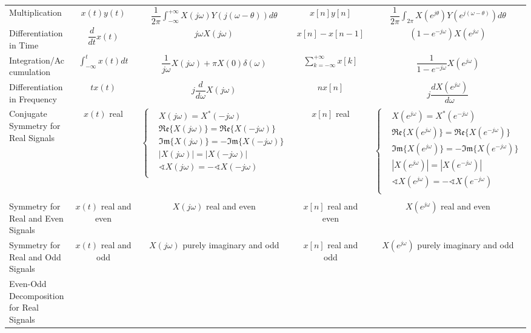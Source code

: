 \documentclass[landscape,a4paper]{article}
\begin{document}
\begin{table}[htbp]
\begin{tabular}{p{12em}<{\centering}cccc}
Multiplication & $x(t)y(t)$ & $\displaystyle\dfrac{1}{2\pi}\int_{-\infty}^{+\infty}X(j\omega)Y(j(\omega-\theta))d\theta$ 
& $x[n]y[n]$ & $\displaystyle\dfrac{1}{2\pi}\int_{2\pi} X(e^{j\theta})Y(e^{j(\omega-\theta)})d\theta$ \\
Differentiation in Time & $\dfrac{d}{dt}x(t)$ & $j\omega X(j\omega)$
& $x[n]-x[n-1]$ & $(1-e^{-j\omega})X(e^{j\omega})$ \\
Integration/Accumulation & $\displaystyle\int_{-\infty}^tx(t)dt$ & $\dfrac{1}{j\omega}X(j\omega)+\pi X(0)\delta(\omega)$ 
& $\displaystyle\sum\limits_{k=-\infty}^{+\infty}x[k]$ & $\dfrac{1}{1-e^{-j\omega}}X(e^{j\omega})$ \\
Differentiation in Frequency & $tx(t)$ & $j\dfrac{d}{d\omega}X(j\omega)$ 
& $nx[n]$ & $j\dfrac{dX(e^{j\omega})}{d\omega}$ \\
Conjugate Symmetry for Real Signals & $x(t)$ real & 
$\left\lbrace\begin{aligned}
&X(j\omega)=X^*(-j\omega) \\
&\mathfrak{Re}\{X(j\omega)\}=\mathfrak{Re}\{X(-j\omega)\} \\
&\mathfrak{Im}\{X(j\omega)\}=-\mathfrak{Im}\{X(-j\omega)\} \\
&|X(j\omega)|=|X(-j\omega)| \\
&\sphericalangle X(j\omega)=-\sphericalangle X(-j\omega) \\
\end{aligned}\right.$
& $x[n]$ real & 
$\left\lbrace\begin{aligned}
&X(e^{j\omega})=X^*(e^{-j\omega}) \\
&\mathfrak{Re}\{X(e^{j\omega})\}=\mathfrak{Re}\{X(e^{-j\omega})\} \\
&\mathfrak{Im}\{X(e^{j\omega})\}=-\mathfrak{Im}\{X(e^{-j\omega})\} \\
&|X(e^{j\omega})|=|X(e^{-j\omega})| \\
&\sphericalangle X(e^{j\omega})=-\sphericalangle X(e^{-j\omega}) \\
\end{aligned}\right.$\\
& \\
Symmetry for Real and Even Signals & $x(t)$ real and even & $X(j\omega)$ real and even 
& $x[n]$ real and even & $X(e^{j\omega})$ real and even \\
Symmetry for Real and Odd Signals & $x(t)$ real and odd & $X(j\omega)$ purely imaginary and odd 
& $x[n]$ real and odd & $X(e^{j\omega})$ purely imaginary and odd \\
Even-Odd Decomposition for Real Signals & 

\end{tabular}
\end{table}
\end{document}
